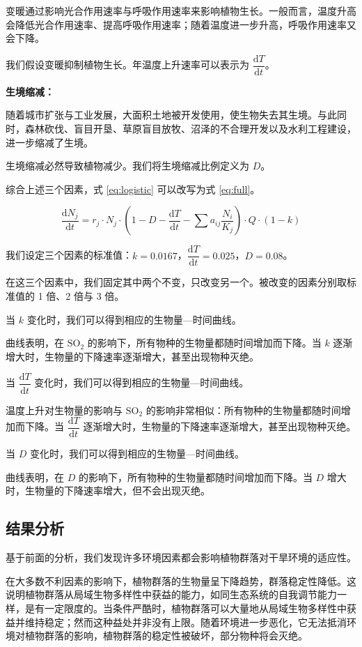 \documentclass[11pt,a4paper]{ctexart}
\begin{document}
变暖通过影响光合作用速率与呼吸作用速率来影响植物生长。一般而言，温度升高会降低光合作用速率、提高呼吸作用速率；随着温度进一步升高，呼吸作用速率又会下降。

我们假设变暖抑制植物生长。年温度上升速率可以表示为 $\dfrac{\mathrm{d}T}{\mathrm{d}t}$。

\textbf{生境缩减：}

随着城市扩张与工业发展，大面积土地被开发使用，使生物失去其生境。与此同时，森林砍伐、盲目开垦、草原盲目放牧、沼泽的不合理开发以及水利工程建设，进一步缩减了生境。

生境缩减必然导致植物减少。我们将生境缩减比例定义为 $D$。

综合上述三个因素，式 \eqref{eq:logistic} 可以改写为式 \eqref{eq:full}。

\begin{equation}
\frac{\mathrm{d}N_j}{\mathrm{d}t}=r_j\cdot N_j\cdot\left(1-D-\frac{\mathrm{d}T}{\mathrm{d}t}-\sum a_{ij}\frac{N_i}{K_j}\right)\cdot Q\cdot(1-k)
\label{eq:full}
\end{equation}

我们设定三个因素的标准值：$k=0.0167$，$\dfrac{\mathrm{d}T}{\mathrm{d}t}=0.025$，$D=0.08$。

在这三个因素中，我们固定其中两个不变，只改变另一个。被改变的因素分别取标准值的 1 倍、2 倍与 3 倍。

当 $k$ 变化时，我们可以得到相应的生物量—时间曲线。

曲线表明，在 $\mathrm{SO_2}$ 的影响下，所有物种的生物量都随时间增加而下降。当 $k$ 逐渐增大时，生物量的下降速率逐渐增大，甚至出现物种灭绝。

当 $\dfrac{\mathrm{d}T}{\mathrm{d}t}$ 变化时，我们可以得到相应的生物量—时间曲线。

温度上升对生物量的影响与 $\mathrm{SO_2}$ 的影响非常相似：所有物种的生物量都随时间增加而下降。当 $\dfrac{\mathrm{d}T}{\mathrm{d}t}$ 逐渐增大时，生物量的下降速率逐渐增大，甚至出现物种灭绝。

当 $D$ 变化时，我们可以得到相应的生物量—时间曲线。

曲线表明，在 $D$ 的影响下，所有物种的生物量都随时间增加而下降。当 $D$ 增大时，生物量的下降速率增大，但不会出现灭绝。

\subsection{结果分析}

基于前面的分析，我们发现许多环境因素都会影响植物群落对干旱环境的适应性。

在大多数不利因素的影响下，植物群落的生物量呈下降趋势，群落稳定性降低。这说明植物群落从局域生物多样性中获益的能力，如同生态系统的自我调节能力一样，是有一定限度的。当条件严酷时，植物群落可以大量地从局域生物多样性中获益并维持稳定；然而这种益处并非没有上限。随着环境进一步恶化，它无法抵消环境对植物群落的影响，植物群落的稳定性被破坏，部分物种将会灭绝。
\end{document}
